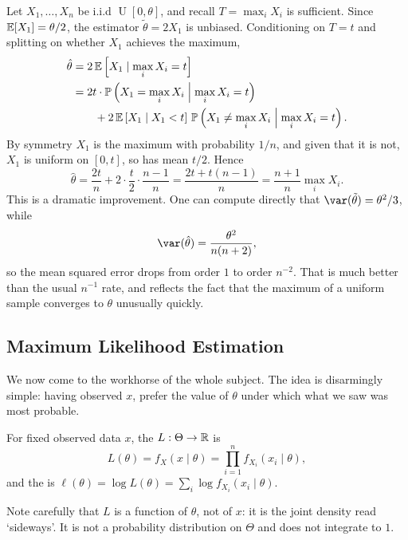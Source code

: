 \documentclass[a4paper]{scrartcl}
\newcommand{\Unif}{\operatorname{U}}
\begin{document}
\begin{example}
  Let $X_1, \dots, X_n$ be i.i.d $\Unif[0,\theta]$, and recall $T = \max_i X_i$ is sufficient. Since $\mathbb{E}[X_1] = \theta/2$, the estimator $\tilde\theta = 2X_1$ is unbiased. Conditioning on $T = t$ and splitting on whether $X_1$ achieves the maximum,
  \begin{align*}
    \hat\theta &= 2\,\mathbb{E}\left[X_1 \mid \max_i X_i = t\right]\\
    &= 2t \cdot \mathbb{P}\left(X_1 = \max_i X_i \;\middle|\; \max_i X_i = t\right)\\
    &\qquad + 2\,\mathbb{E}\left[X_1 \;\middle|\; X_1 < t\right]\,\mathbb{P}\left(X_1 \neq \max_i X_i \;\middle|\; \max_i X_i = t\right).
  \end{align*}
  By symmetry $X_1$ is the maximum with probability $1/n$, and given that it is not, $X_1$ is uniform on $[0,t]$, so has mean $t/2$. Hence
  $$
  \hat\theta = \frac{2t}{n} + 2\cdot\frac{t}{2}\cdot\frac{n-1}{n} = \frac{2t + t(n-1)}{n} = \frac{n+1}{n}\max_i X_i.
  $$
  This is a dramatic improvement. One can compute directly that $\var(\tilde\theta) = \theta^2/3$, while
  $$
  \var(\hat\theta) = \frac{\theta^2}{n(n+2)},
  $$
  so the mean squared error drops from order $1$ to order $n^{-2}$. That is much better than the usual $n^{-1}$ rate, and reflects the fact that the maximum of a uniform sample converges to $\theta$ unusually quickly.
\end{example}

\subsection{Maximum Likelihood Estimation}

We now come to the workhorse of the whole subject. The idea is disarmingly simple: having observed $x$, prefer the value of $\theta$ under which what we saw was most probable.

\begin{definition}[Likelihood]
  For fixed observed data $x$, the  $L: \Theta \to \mathbb{R}$ is
  $$
  L(\theta) = f_X(x \mid \theta) = \prod_{i=1}^{n} f_{X_i}(x_i \mid \theta),
  $$
  and the  is $\ell(\theta) = \log L(\theta) = \sum_i \log f_{X_i}(x_i \mid \theta)$.
\end{definition}

Note carefully that $L$ is a function of $\theta$, not of $x$: it is the joint density read `sideways'. It is not a probability distribution on $\Theta$ and does not integrate to $1$.
\end{document}
